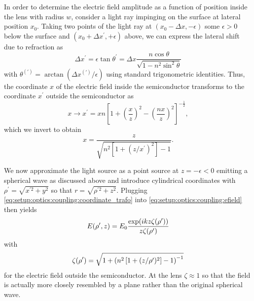 In order to determine the electric field amplitude as a function of position inside the lens with radius $w$, consider a light ray impinging on the surface at lateral position $x_0$.
Taking two points of the light ray at $(x_0-\Delta x, -\epsilon)$ some $\epsilon > 0$ below the surface and $(x_0 + \Delta x^\prime, +\epsilon)$ above, we can express the lateral shift due to refraction as
\begin{equation}
    \Delta x^{\prime} = \epsilon\tan\theta^{\prime} = \Delta x \frac{n\cos\theta}{\sqrt{1 - n^2\sin^2\theta}}
\end{equation}
with $\theta^{(\prime)} = \arctan(\Delta x^{(\prime)}/\epsilon)$ using standard trigonometric identities.
Thus, the coordinate $x$ of the electric field inside the semiconductor transforms to the coordinate $x^\prime$ outside the semiconductor as
\begin{equation}
    x\to x^{\prime} = x n \left[1 + \left(\frac{x}{z}\right)^2 - \left(\frac{nx}{z}\right)^2\right]^{-\frac{1}{2}},
\end{equation}
which we invert to obtain
\begin{equation}\label{eq:setup:optics:coupling:coordinate_trafo}
    x = \frac{z}{\sqrt{n^2\left[1 + (z/x^{\prime})^2\right] - 1}}.
\end{equation}

We now approximate the light source as a point source at $z=-\epsilon < 0$ emitting a spherical wave as discussed above and introduce cylindrical coordinates with $\rho^{\prime} = \sqrt{x^{\prime 2} + y^2}$ so that $r = \sqrt{\rho^{\prime 2} + z^2}$.
Plugging \cref{eq:setup:optics:coupling:coordinate_trafo} into \cref{eq:setup:optics:coupling:efield} then yields
\begin{equation}\label{eq:setup:optics:coupling:efield:lens}
    E(\rho^\prime,z) = E_0\frac{\exp(i k z\zeta(\rho^{\prime}))}{z\zeta(\rho^{\prime})}
\end{equation}
with
\begin{equation}
    \zeta(\rho^{\prime}) = \sqrt{1 + \left(n^2\left[1 + (z/\rho^{\prime})^2\right] - 1\right)^{-1}}
\end{equation}
for the electric field outside the semiconductor.
At the lens $\zeta\approx 1$ so that the field is actually more closely resembled by a plane rather than the original spherical wave.

